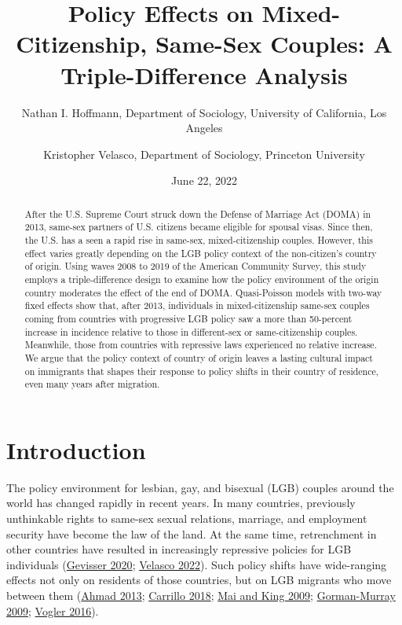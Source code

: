 \documentclass[
  12pt,
]{article}
\title{Policy Effects on Mixed-Citizenship, Same-Sex Couples: A Triple-Difference Analysis}
\author{Nathan I. Hoffmann, Department of Sociology, University of California, Los Angeles \and Kristopher Velasco, Department of Sociology, Princeton University}
\date{June 22, 2022}
\begin{document}
\maketitle
\begin{abstract}
After the U.S. Supreme Court struck down the Defense of Marriage Act (DOMA) in 2013, same-sex partners of U.S. citizens became eligible for spousal visas. Since then, the U.S. has a seen a rapid rise in same-sex, mixed-citizenship couples. However, this effect varies greatly depending on the LGB policy context of the non-citizen's country of origin. Using waves 2008 to 2019 of the American Community Survey, this study employs a triple-difference design to examine how the policy environment of the origin country moderates the effect of the end of DOMA. Quasi-Poisson models with two-way fixed effects show that, after 2013, individuals in mixed-citizenship same-sex couples coming from countries with progressive LGB policy saw a more than 50-percent increase in incidence relative to those in different-sex or same-citizenship couples. Meanwhile, those from countries with repressive laws experienced no relative increase. We argue that the policy context of country of origin leaves a lasting cultural impact on immigrants that shapes their response to policy shifts in their country of residence, even many years after migration.
\end{abstract}

\hypertarget{introduction}{%
\section{Introduction}\label{introduction}}

The policy environment for lesbian, gay, and bisexual (LGB) couples around the world has changed rapidly in recent years. In many countries, previously unthinkable rights to same-sex sexual relations, marriage, and employment security have become the law of the land. At the same time, retrenchment in other countries have resulted in increasingly repressive policies for LGB individuals (\protect\hyperlink{ref-gevisser_2020_pink}{Gevisser 2020}; \protect\hyperlink{ref-velasco_2022_opposition}{Velasco 2022}). Such policy shifts have wide-ranging effects not only on residents of those countries, but on LGB migrants who move between them (\protect\hyperlink{ref-ahmad_2013}{Ahmad 2013}; \protect\hyperlink{ref-carrillo_2018}{Carrillo 2018}; \protect\hyperlink{ref-mai_2009}{Mai and King 2009}; \protect\hyperlink{ref-gorman-murray_2009}{Gorman-Murray 2009}; \protect\hyperlink{ref-vogler_2016}{Vogler 2016}).
\end{document}
